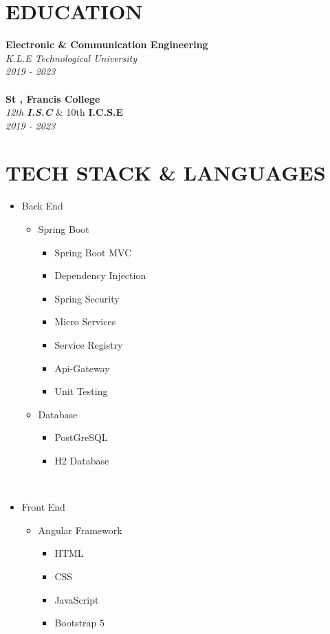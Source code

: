 \documentclass[a4paper,10pt]{article}
\begin{document}
\begin{multicols}{2}
\section*{EDUCATION}
\textbf{Electronic \& Communication Engineering} \\
\textit{K.L.E Technological University} \\
\textit{2019 - 2023}\\
\\
\textbf{St , Francis College} \\
\textit{12th \textbf{I.S.C}}  \& 10th \textbf{I.C.S.E} \\
\textit{2019 - 2023}

\section*{TECH STACK \& LANGUAGES}
\begin{multicols}{2}
\begin{itemize}[leftmargin=*]
    \item Back End
    \begin{itemize}[leftmargin=*]
        \item Spring Boot
            \begin{itemize}[leftmargin=*]
                \item Spring Boot MVC
                \item Dependency Injection
                \item Spring Security
                \item Micro Services
                \item Service Registry
                \item Api-Gateway
                \item Unit Testing
            \end{itemize}
        \item Database
            \begin{itemize}[leftmargin=*]
                \item PostGreSQL
                \item H2 Database
            \end{itemize}
    \end{itemize}
    \\
    \item Front End
    \begin{itemize}[leftmargin=*]
        \item Angular Framework
        \begin{itemize}[leftmargin=*]
            \item HTML
                 \item CSS
                 \item JavaScript
                 \item Bootstrap 5
        \end{itemize}
     \end{itemize}
\end{itemize}
\end{multicols}


\end{multicols}
\end{document}
